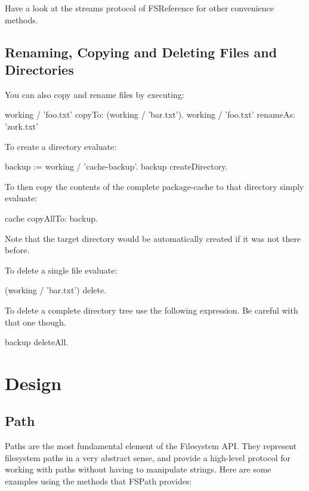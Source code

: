 \documentclass[a4paper,10pt,twoside]{book}
\begin{document}
Have a look at the streams protocol of FSReference for other convenience methods.

\subsection{Renaming, Copying and Deleting Files and Directories}

You can also copy and rename files by executing:

\begin{code}{}
working / 'foo.txt' copyTo: (working / 'bar.txt').
working / 'foo.txt' renameAs: 'zork.txt'
\end{code} 

To create a directory evaluate:
\begin{code}{}
 backup := working / 'cache-backup'.
 backup createDirectory.
\end{code} 

To then copy the contents of the complete package-cache to that directory simply evaluate:

\begin{code}{}
 cache copyAllTo: backup.
\end{code}

Note that the target directory would be automatically created if it was not there before.

To delete a single file evaluate:

\begin{code}{}
 (working / 'bar.txt') delete.
\end{code}

To delete a complete directory tree use the following expression. Be careful with that one though.

\begin{code}
 backup deleteAll.
\end{code}


\section{Design }

\subsection{Path}

Paths are the most fundamental element of the Filesystem API. They represent filesystem paths in a very abstract sense, and provide a high-level protocol for working with paths without having to manipulate strings. Here are some examples using the methods that FSPath provides:
\end{document}
